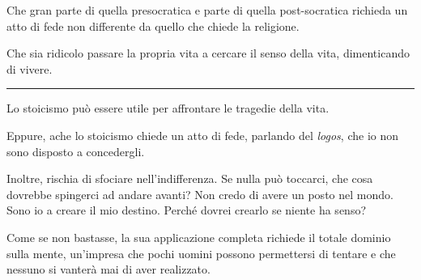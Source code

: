 \documentclass[a4paper,oneside,11pt]{memoir}
\begin{document}
Che gran parte di quella presocratica e parte di quella post-socratica richieda
un atto di fede non differente da quello che chiede la religione.

Che sia ridicolo passare la propria vita a cercare il senso della vita,
dimenticando di vivere.

\plainbreak{1}

Lo stoicismo può essere utile per affrontare le tragedie della vita.

Eppure, ache lo stoicismo chiede un atto di fede, parlando del \emph{logos}, che
io non sono disposto a concedergli.

Inoltre, rischia di sfociare nell'indifferenza. Se nulla può toccarci, che cosa
dovrebbe spingerci ad andare avanti? Non credo di avere un posto nel mondo. Sono
io a creare il mio destino. Perché dovrei crearlo se niente ha senso?

Come se non bastasse, la sua applicazione completa richiede il totale dominio
sulla mente, un'impresa che pochi uomini possono permettersi di tentare e che
nessuno si vanterà mai di aver realizzato.

\backmatter

\tableofcontents
\end{document}
